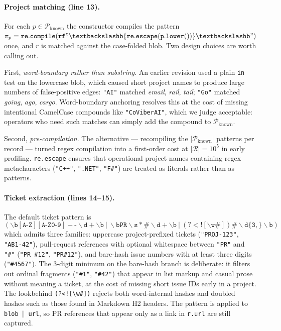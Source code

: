 \paragraph{Project matching (line 13).}
For each $p \in \mathcal{P}_{\text{known}}$ the constructor compiles the pattern $\pi_p = \mathtt{re.compile(rf"\textbackslash b\{re.escape(p.lower())\}\textbackslash b")}$ once, and $r$ is matched against the case-folded blob. Two design choices are worth calling out.

First, \emph{word-boundary rather than substring}. An earlier revision used a plain \texttt{in} test on the lowercase blob, which caused short project names to produce large numbers of false-positive edges: \texttt{"AI"} matched \emph{email}, \emph{rail}, \emph{tail}; \texttt{"Go"} matched \emph{going}, \emph{ago}, \emph{cargo}. Word-boundary anchoring resolves this at the cost of missing intentional CamelCase compounds like \texttt{"CoViberAI"}, which we judge acceptable: operators who need such matches can simply add the compound to $\mathcal{P}_{\text{known}}$.

Second, \emph{pre-compilation}. The alternative — recompiling the $|\mathcal{P}_{\text{known}}|$ patterns per record — turned regex compilation into a first-order cost at $|\mathcal{R}| = 10^5$ in early profiling. \texttt{re.escape} ensures that operational project names containing regex metacharacters (\texttt{"C++"}, \texttt{".NET"}, \texttt{"F\#"}) are treated as literals rather than as patterns.

\paragraph{Ticket extraction (lines 14--15).}
The default ticket pattern is
\[
\mathtt{(\backslash b[A\text{-}Z][A\text{-}Z0\text{-}9]+\text{-}\backslash d+\backslash b\ |\ \backslash bPR\backslash s*\#\backslash d+\backslash b\ |\ (?<![\backslash w\#])\#\backslash d\{3,\}\backslash b)}
\]
which admits three families: uppercase project-prefixed tickets (\texttt{"PROJ-123"}, \texttt{"AB1-42"}), pull-request references with optional whitespace between \texttt{"PR"} and \texttt{"\#"} (\texttt{"PR \#12"}, \texttt{"PR\#12"}), and bare-hash issue numbers with at least three digits (\texttt{"\#4567"}). The 3-digit minimum on the bare-hash branch is deliberate: it filters out ordinal fragments (\texttt{"\#1"}, \texttt{"\#42"}) that appear in list markup and casual prose without meaning a ticket, at the cost of missing short issue IDs early in a project. The lookbehind \texttt{(?<![\textbackslash w\#])} rejects both word-internal hashes and doubled hashes such as those found in Markdown H2 headers. The pattern is applied to \texttt{blob $\Vert$ url}, so PR references that appear only as a link in \texttt{r.url} are still captured.

